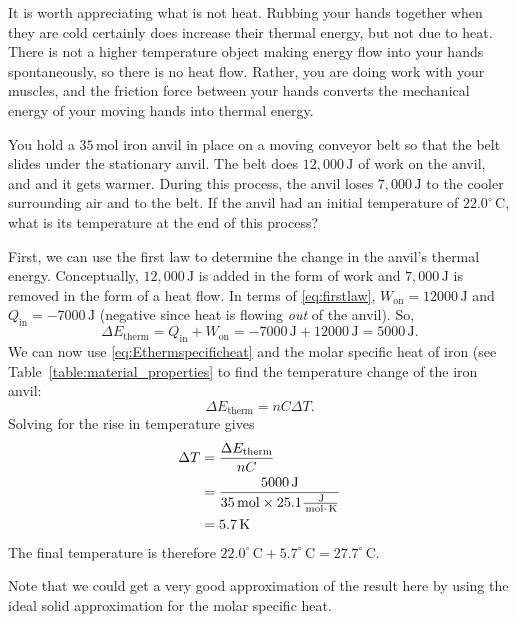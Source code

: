 It is worth appreciating what is not heat.  Rubbing your hands
together when they are cold certainly does increase their thermal
energy, but not due to heat.  There is not a higher temperature object
making energy flow into your hands spontaneously, so there is no heat
flow.  Rather, you are doing work with your muscles, and the friction
force between your hands converts the mechanical energy of your moving
hands into thermal energy.

\begin{example}
You hold a $35\,\text{mol}$ iron anvil in place on a moving conveyor belt
so that the belt slides under the stationary anvil. The belt does 
$12,000\,\text{J}$ of work on the anvil, and and it gets warmer. During 
this process, the anvil loses $7,000\,\text{J}$ to the cooler surrounding air 
and to the belt.  If the anvil had an initial temperature of 
$22.0^{\circ}\,\text{C}$, what is its temperature at the end of this 
process?



\solution
First, we can use the first law to determine the change in the anvil's
thermal energy.  Conceptually, $12,000\,\text{J}$ is  added in the form
of work and $7,000\,\text{J}$ is removed in the form of a heat flow.  In terms
of \eqref{eq:firstlaw}, $W_\text{on}=12000\,\text{J}$ and 
$Q_\text{in}=-7000\,\text{J}$ (negative since heat is flowing \emph{out}
of the anvil).  So,
\begin{equation*}
\Delta E_\text{therm} = Q_\text{in} + W_\text{on} 
     = -7000\,\text{J} + 12000\,\text{J}= 5000\,\text{J}.
\end{equation*}
We can now use \eqref{eq:Ethermspecificheat} and the molar specific
heat of iron (see Table~\ref{table:material_properties} to find the
temperature change of the iron anvil:  
\begin{equation*}
\Delta E_\text{therm} = n C \Delta T.
\end{equation*}
Solving for the rise in temperature gives
\begin{eqnarray*}
\Delta T =\mathstrut & \frac{\Delta E_\text{therm}}{nC} \\
         =\mathstrut & \frac{5000\,\text{J}}{35\,\text{mol} \times 25.1\frac{\,\text{J}}
{\,\text{mol} \cdot \,\text{K}}} \\
         =\mathstrut & 5.7\,\text{K}
\end{eqnarray*}  
The final temperature is therefore $22.0^\circ\,\text{C} + 5.7^\circ\,\text{C} = 
27.7^\circ\,\text{C}$.


Note that we could get a very good approximation of the result here by using
the ideal solid approximation for the molar
specific heat.

\end{example}


